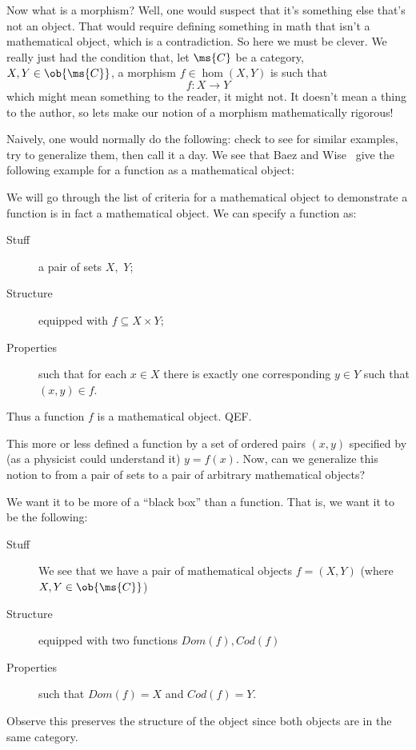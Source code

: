 
Now what is a morphism? Well, one would suspect that it's
something else that's not an object. That would require defining
something in math that isn't a mathematical object, which is a
contradiction. So here we must be clever. We really just had the
condition that, let $\ms{C}$ be a category, $X,Y\in\ob{\ms{C}}$, a morphism
$f\in\hom(X,Y)$ is such that
\begin{equation}%
f:X\to Y
\end{equation}
which might mean something to the reader, it might not. It
doesn't mean a thing to the author, so lets make our notion of a
morphism mathematically rigorous! 

Naively, one would normally do the following: check to see for
similar examples, try to generalize them, then call it a day. We
see that Baez and Wise~\cite{BaezWise:2004ln} give the following
example for a function as a mathematical object:
\begin{ex}
We will go through the list of criteria for a mathematical object
to demonstrate a function is in fact a mathematical object. We
can specify a function as:
\begin{description}
\item[Stuff] a pair of sets $X,$ $Y$;
\item[Structure] equipped with $f\subseteq X\times Y$;
\item[Properties] such that for each $x\in X$ there is exactly
  one corresponding $y\in Y$ such that $(x,y)\in f$.
\end{description}
\noindent Thus a function $f$ is a mathematical object. QEF.
\end{ex}

This more or less defined a function by a set of ordered pairs
$(x,y)$ specified by (as a physicist could understand it)
$y=f(x)$. Now, can we generalize this notion to from a pair of
sets to a pair of arbitrary mathematical objects?

We want it to be more of a ``black box'' than a function. That 
is, we want it to be the following:
\begin{description}
\item[Stuff] We see that we have a pair of mathematical objects 
  $f=(X,Y)$ (where $X,Y\in\ob{\ms{C}}$)
\item[Structure] equipped with two functions $Dom(f), Cod(f)$
\item[Properties] such that $Dom(f)=X$ and $Cod(f)=Y$.
\end{description}
Observe this preserves the structure of the object since both 
objects are in the same category. 


